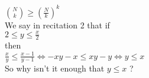 \documentclass{article}
\begin{document}
${{N}\choose{k}} \ge \left ( \frac{N}{k} \right )^k$\\

We say in recitation 2 that if\\
$2 \leq  y \leq  \frac{x}{2}$ \\
then\\
$\frac{x}{y} \leq \frac{x - 1}{y - 1}  \iff -xy-x \leq xy -y \iff y \leq x$\\
So why isn't it enough that 
$y \leq x$ ?\\
\end{document}
